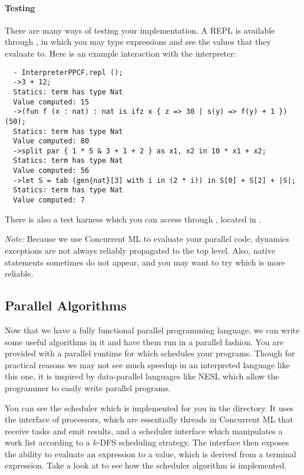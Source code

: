 \paragraph{Testing}

There are many ways of testing your implementation. A REPL is available through
, in which you may type \LangPPCF{} expressions and see the values that
they evaluate to. Here is an example interaction with the interpreter:
\begin{lstlisting}
  - InterpreterPPCF.repl ();
  ->3 + 12;
  Statics: term has type Nat
  Value computed: 15
  ->(fun f (x : nat) : nat is ifz x { z => 30 | s(y) => f(y) + 1 })(50);
  Statics: term has type Nat
  Value computed: 80
  ->split par { 1 * 5 & 3 + 1 + 2 } as x1, x2 in 10 * x1 + x2;
  Statics: term has type Nat
  Value computed: 56
  ->let S = tab (gen{nat}[3] with i in (2 * i)) in S[0] + S[2] + |S|;
  Statics: term has type Nat
  Value computed: 7
\end{lstlisting}
There is also a test harness which you can access through , located in .

\emph{Note:} Because we use Concurrent ML to evaluate your parallel code, dynamics exceptions are
not always reliably propagated to the top level. Also, native  statements sometimes do
not appear, and you may want to try  which is more reliable.

\subsection{Parallel Algorithms}

Now that we have a fully functional parallel programming language, we can write some useful
algorithms in it and have them run in a parallel fashion. You are provided with a parallel runtime
for \LangPPCFv{} which schedules your programs. Though
for practical reasons we may not see much speedup in an interpreted language like this one,
it is inspired by data-parallel languages like NESL which allow the programmer to easily write
parallel programs.

You can see the scheduler which is implemented for you in the  directory. It uses
the interface of processors, which are essentially threads in Concurrent ML that receive tasks and
emit results, and a scheduler interface which manipulates a work list according to a
$k$-DFS scheduling strategy. The  interface then exposes the ability to evaluate
an expression to a value, which is derived from a terminal  expression. Take a look
at  to see how the scheduler algorithm is implemented.

